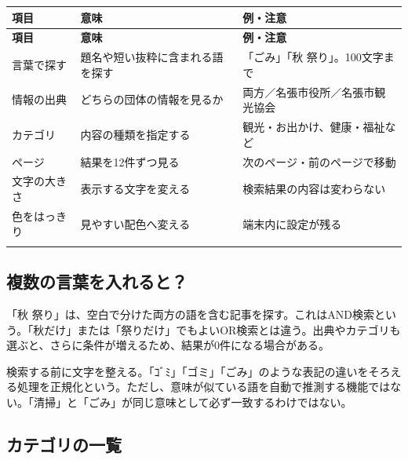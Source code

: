 \documentclass[a4paper,10pt]{ltjsarticle}
\begin{document}
{\small\begin{longtable}{@{}>{\raggedright\arraybackslash}p{}>{\raggedright\arraybackslash}p{}>{\raggedright\arraybackslash}p{}@{}}

\rowcolor{Pale}\textbf{項目} & \textbf{意味} & \textbf{例・注意} \\ \midrule

\endfirsthead

\rowcolor{Pale}\textbf{項目} & \textbf{意味} & \textbf{例・注意} \\ \midrule\endhead

言葉で探す & 題名や短い抜粋に含まれる語を探す & 「ごみ」「秋 祭り」。100文字まで \\ \addlinespace[3pt]

情報の出典 & どちらの団体の情報を見るか & 両方／名張市役所／名張市観光協会 \\ \addlinespace[3pt]

カテゴリ & 内容の種類を指定する & 観光・お出かけ、健康・福祉など \\ \addlinespace[3pt]

ページ & 結果を12件ずつ見る & 次のページ・前のページで移動 \\ \addlinespace[3pt]

文字の大きさ & 表示する文字を変える & 検索結果の内容は変わらない \\ \addlinespace[3pt]

色をはっきり & 見やすい配色へ変える & 端末内に設定が残る \\ \addlinespace[3pt]

\bottomrule\end{longtable}}

\subsection*{複数の言葉を入れると？}

「秋 祭り」は、空白で分けた両方の語を含む記事を探す。これはAND検索という。「秋だけ」または「祭りだけ」でもよいOR検索とは違う。出典やカテゴリも選ぶと、さらに条件が増えるため、結果が0件になる場合がある。


検索する前に文字を整える。「ｺﾞﾐ」「ゴミ」「ごみ」のような表記の違いをそろえる処理を正規化という。ただし、意味が似ている語を自動で推測する機能ではない。「清掃」と「ごみ」が同じ意味として必ず一致するわけではない。


\subsection*{カテゴリの一覧}
\end{document}
